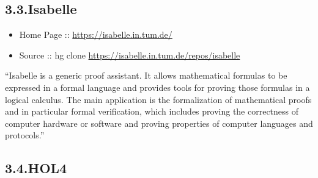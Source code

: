 \documentclass[12pt,twoside]{article}
\begin{document}
\subsection{3.3.\hspace*{0.5em}Isabelle}\label{sec-isabelle}%

\begin{itemize}[noitemsep,topsep=\mdcompacttopsep]%

\item{}Home Page :: \href{https://isabelle.in.tum.de/}{{\ttfamily https://\hspace{0pt}isabelle.\hspace{0pt}in.\hspace{0pt}tum.\hspace{0pt}de/\hspace{0pt}}}%

\item{}Source :: hg clone \href{https://isabelle.in.tum.de/repos/isabelle}{{\ttfamily https://\hspace{0pt}isabelle.\hspace{0pt}in.\hspace{0pt}tum.\hspace{0pt}de/\hspace{0pt}repos/\hspace{0pt}isabelle}}%
\end{itemize}%

\noindent{}\textquotedblleft{}Isabelle is a generic proof assistant. It allows mathematical
formulas to be expressed in a formal language and provides tools for
proving those formulas in a logical calculus. The main application is
the formalization of mathematical proofs and in particular formal
verification, which includes proving the correctness of computer
hardware or software and proving properties of computer languages and
protocols.\textquotedblright{}%

\subsection{3.4.\hspace*{0.5em}HOL4}\label{sec-hol4}%
\end{document}
